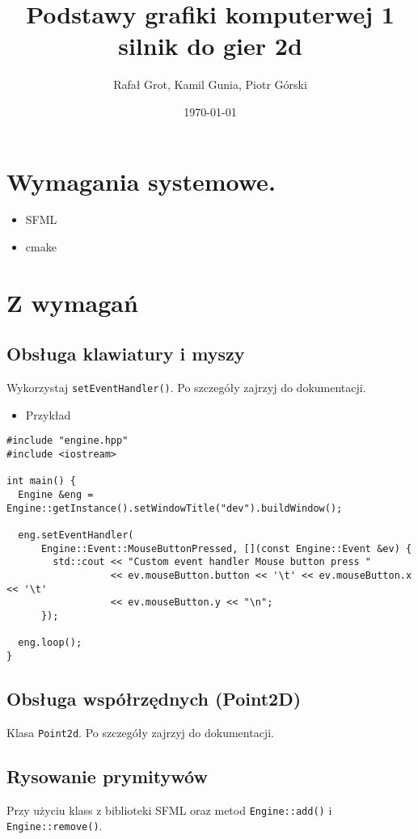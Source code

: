 \documentclass[11pt]{article}
\author{Rafał Grot, Kamil Gunia, Piotr Górski}
\date{\today}
\title{Podstawy grafiki komputerwej 1 silnik do gier 2d}
\begin{document}
\maketitle
\newpage
\section{Wymagania systemowe.}
\label{sec:org934f79c}
\begin{itemize}
\item SFML
\item cmake
\end{itemize}
\section{Z wymagań}
\label{sec:orga7a6f07}
\subsection{Obsługa klawiatury i myszy}
\label{sec:orga83a5de}
Wykorzystaj \texttt{setEventHandler()}. Po szczegóły zajrzyj do dokumentacji.

\begin{itemize}
\item Przykład
\end{itemize}
\begin{verbatim}
#include "engine.hpp"
#include <iostream>

int main() {
  Engine &eng = Engine::getInstance().setWindowTitle("dev").buildWindow();

  eng.setEventHandler(
      Engine::Event::MouseButtonPressed, [](const Engine::Event &ev) {
        std::cout << "Custom event handler Mouse button press "
                  << ev.mouseButton.button << '\t' << ev.mouseButton.x << '\t'
                  << ev.mouseButton.y << "\n";
      });

  eng.loop();
}
\end{verbatim}
\subsection{Obsługa współrzędnych (Point2D)}
\label{sec:org311082e}
Klasa \texttt{Point2d}. Po szczegóły zajrzyj do dokumentacji.
\subsection{Rysowanie prymitywów}
\label{sec:orgd4aba17}
Przy użyciu klass z biblioteki SFML oraz metod \texttt{Engine::add()} i \texttt{Engine::remove()}.
\end{document}
